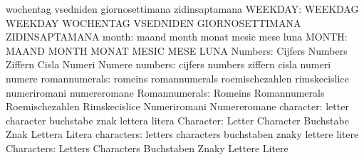                                   wochentag                        vsedniden
                                  giornosettimana                  zidinsaptamana
                         WEEKDAY: WEEKDAG                          WEEKDAY
                                  WOCHENTAG                        VSEDNIDEN
                                  GIORNOSETTIMANA                  ZIDINSAPTAMANA
                           month: maand                            month
                                  monat                            mesic
                                  mese                             luna
                           MONTH: MAAND                            MONTH
                                  MONAT                            MESIC
                                  MESE                             LUNA
                         Numbers: Cijfers                          Numbers
                                  Ziffern                          Cisla
                                  Numeri                           Numere
                         numbers: cijfers                          numbers
                                  ziffern                          cisla
                                  numeri                           numere
                   romannumerals: romeins                          romannumerals
                                  roemischezahlen                  rimskecislice
                                  numeriromani                     numereromane
                   Romannumerals: Romeins                          Romannumerals
                                  Roemischezahlen                  Rimskecislice
                                  Numeriromani                     Numereromane
                       character: letter                           character
                                  buchstabe                        znak
                                  lettera                          litera
                       Character: Letter                           Character
                                  Buchstabe                        Znak
                                  Lettera                          Litera
                      characters: letters                          characters
                                  buchstaben                       znaky
                                  lettere                          litere
                      Characters: Letters                          Characters
                                  Buchstaben                       Znaky
                                  Lettere                          Litere
